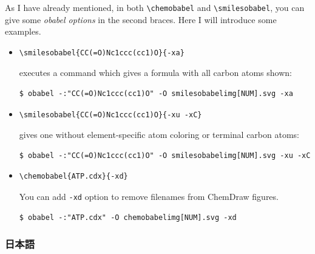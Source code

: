 \documentclass[12pt]{ltjsarticle}
\begin{document}
As I have already mentioned, in both \verb|\chemobabel| and \verb|\smilesobabel|,
you can give some \textit{obabel options} in the second braces.
Here I will introduce some examples.
\begin{itemize}
\item
\begin{verbatim}
\smilesobabel{CC(=O)Nc1ccc(cc1)O}{-xa}
\end{verbatim}
executes a command which gives a formula with all carbon atoms shown:
\begin{verbatim}
$ obabel -:"CC(=O)Nc1ccc(cc1)O" -O smilesobabelimg[NUM].svg -xa
\end{verbatim}
\item
\begin{verbatim}
\smilesobabel{CC(=O)Nc1ccc(cc1)O}{-xu -xC}
\end{verbatim}
gives one without element-specific atom coloring or terminal carbon atoms:
\begin{verbatim}
$ obabel -:"CC(=O)Nc1ccc(cc1)O" -O smilesobabelimg[NUM].svg -xu -xC
\end{verbatim}
\item
\begin{verbatim}
\chemobabel{ATP.cdx}{-xd}
\end{verbatim}
You can add \texttt{-xd} option to remove filenames from ChemDraw figures.
\begin{verbatim}
$ obabel -:"ATP.cdx" -O chemobabelimg[NUM].svg -xd
\end{verbatim}
\end{itemize}

\subsubsection{日本語}
\end{document}
